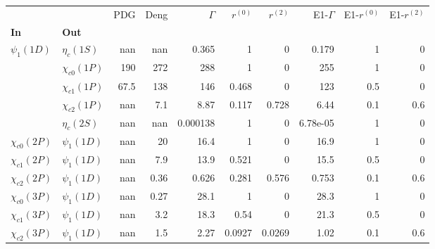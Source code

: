 \begin{tabular}{l|l|r|r|r|r|r|r|r|r}
\toprule
                &                &  PDG &  Deng &  $\Gamma$ &  $r^{(0)}$ &  $r^{(2)}$ &  E1-$\Gamma$ &  E1-$r^{(0)}$ &  E1-$r^{(2)}$ \\
\textbf{In} & \textbf{Out} &      &       &           &            &            &              &               &               \\
\midrule
\textbf{$\psi_{1}(1D)$} & \textbf{$\eta_{c}(1S)$} &  nan &   nan &     0.365 &          1 &          0 &        0.179 &             1 &             0 \\
                & \textbf{$\chi_{c0}(1P)$} &  190 &   272 &       288 &          1 &          0 &          255 &             1 &             0 \\
                & \textbf{$\chi_{c1}(1P)$} & 67.5 &   138 &       146 &      0.468 &          0 &          123 &           0.5 &             0 \\
                & \textbf{$\chi_{c2}(1P)$} &  nan &   7.1 &      8.87 &      0.117 &      0.728 &         6.44 &           0.1 &           0.6 \\
                & \textbf{$\eta_{c}(2S)$} &  nan &   nan &  0.000138 &          1 &          0 &     6.78e-05 &             1 &             0 \\
\textbf{$\chi_{c0}(2P)$} & \textbf{$\psi_{1}(1D)$} &  nan &    20 &      16.4 &          1 &          0 &         16.9 &             1 &             0 \\
\textbf{$\chi_{c1}(2P)$} & \textbf{$\psi_{1}(1D)$} &  nan &   7.9 &      13.9 &      0.521 &          0 &         15.5 &           0.5 &             0 \\
\textbf{$\chi_{c2}(2P)$} & \textbf{$\psi_{1}(1D)$} &  nan &  0.36 &     0.626 &      0.281 &      0.576 &        0.753 &           0.1 &           0.6 \\
\textbf{$\chi_{c0}(3P)$} & \textbf{$\psi_{1}(1D)$} &  nan &  0.27 &      28.1 &          1 &          0 &         28.3 &             1 &             0 \\
\textbf{$\chi_{c1}(3P)$} & \textbf{$\psi_{1}(1D)$} &  nan &   3.2 &      18.3 &       0.54 &          0 &         21.3 &           0.5 &             0 \\
\textbf{$\chi_{c2}(3P)$} & \textbf{$\psi_{1}(1D)$} &  nan &   1.5 &      2.27 &     0.0927 &     0.0269 &         1.02 &           0.1 &           0.6 \\
\bottomrule
\end{tabular}
